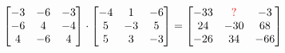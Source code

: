 \documentclass[border=5pt]{standalone}
\begin{document}
      $\begin{bmatrix} -3 & -6 & -3 \\ -6 & 4 & -4 \\ 4 & -6 & 4 \end{bmatrix} \cdot \begin{bmatrix} -4 & 1 & -6 \\ 5 & -3 & 5 \\ 5 & 3 & -3 \end{bmatrix} = \begin{bmatrix} -33 & \textcolor{red}{?} & -3 \\ 24 & -30 & 68 \\ -26 & 34 & -66 \end{bmatrix}$
      
\end{document}
